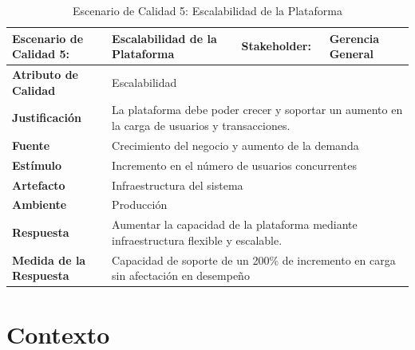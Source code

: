 \documentclass[12pt]{article}
\begin{document}
\begin{table}[H]
    \centering
    \begin{tabular}{|p{5cm}|p{3cm}|p{4cm}|p{4cm}|}
        \hline
        \multicolumn{1}{|p{5cm}|}{\cellcolor{teal!50}\textbf{Escenario de Calidad 5:}} & \multicolumn{1}{p{3cm}|}{Escalabilidad de la Plataforma} & \multicolumn{1}{l|}{\cellcolor{teal!50}\textbf{Stakeholder:}} & \multicolumn{1}{l|}{Gerencia General} \\ \hline
        \multicolumn{1}{|p{5cm}|}{\cellcolor{teal!50}\textbf{Atributo de Calidad}}    & \multicolumn{3}{p{11cm}|}{Escalabilidad} \\ \hline
        \multicolumn{1}{|p{5cm}|}{\cellcolor{teal!50}\textbf{Justificación}}           & \multicolumn{3}{p{11cm}|}{La plataforma debe poder crecer y soportar un aumento en la carga de usuarios y transacciones.} \\ \hline
        \multicolumn{1}{|p{5cm}|}{\cellcolor{teal!50}\textbf{Fuente}}                  & \multicolumn{3}{p{11cm}|}{Crecimiento del negocio y aumento de la demanda} \\ \hline
        \multicolumn{1}{|p{5cm}|}{\cellcolor{teal!50}\textbf{Estímulo}}                & \multicolumn{3}{p{11cm}|}{Incremento en el número de usuarios concurrentes} \\ \hline
        \multicolumn{1}{|p{5cm}|}{\cellcolor{teal!50}\textbf{Artefacto}}               & \multicolumn{3}{p{11cm}|}{Infraestructura del sistema} \\ \hline
        \multicolumn{1}{|p{5cm}|}{\cellcolor{teal!50}\textbf{Ambiente}}                & \multicolumn{3}{p{11cm}|}{Producción} \\ \hline
        \multicolumn{1}{|p{5cm}|}{\cellcolor{teal!50}\textbf{Respuesta}}               & \multicolumn{3}{p{11cm}|}{Aumentar la capacidad de la plataforma mediante infraestructura flexible y escalable.} \\ \hline
        \multicolumn{1}{|p{5cm}|}{\cellcolor{teal!50}\textbf{Medida de la Respuesta}}  & \multicolumn{3}{p{11cm}|}{Capacidad de soporte de un 200\% de incremento en carga sin afectación en desempeño} \\ \hline
    \end{tabular}
    \caption{Escenario de Calidad 5: Escalabilidad de la Plataforma}
    \label{tab:escenarios_calidad_5}
\end{table}


\section{Contexto}
\end{document}
